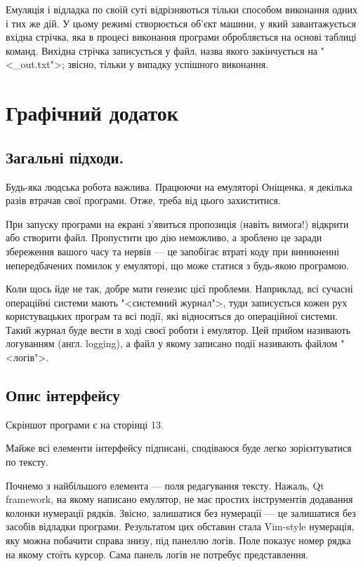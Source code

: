 \documentclass[oneside,final,14pt]{extreport}
\begin{document}
Емуляція і відладка по своїй суті відрізняються тільки способом виконання одних і тих же дій. У цьому режимі створюється об'єкт машини, у який завантажується вхідна стрічка, яка в процесі виконання програми обробляється на основі таблиці команд. Вихідна стрічка записується у файл, назва якого закінчується на "<\_out.txt">; звісно, тільки у випадку успішного виконання.

\chapter{Графічний додаток}

\section{Загальні підходи.}
Будь-яка людська робота важлива. Працюючи на емуляторі Оніщенка, я декілька разів втрачав свої програми. Отже, треба від цього захиститися.
		
При запуску програми на екрані з'явиться пропозиція (навіть вимога!) відкрити або створити файл. Пропустити цю дію неможливо, а зроблено це заради збереження вашого часу та нервів --- це запобігає втраті коду при виникненні непередбачених помилок у емуляторі, що може статися з будь-якою програмою.

Коли щось йде не так, добре мати генезис цієї проблеми. Наприклад, всі сучасні операційні системи мають "<системний журнал">, туди записується кожен рух користувацьких програм та всі події, які відносяться до операційної системи. Такий журнал буде вести в ході своєї роботи і емулятор. Цей прийом називають логуванням (англ. logging), а файл у якому записано події називають файлом "<логів">.

\section{Опис інтерфейсу}
Скріншот програми є на сторінці 13.

\medskip

Майже всі елементи інтерфейсу підписані, сподіваюся буде легко зорієнтуватися по тексту.

Почнемо з найбільшого елемента --- поля редагування тексту. Нажаль, Qt framework, на якому написано емулятор, не має простих інструментів додавання колонки нумерації рядків. Звісно, залишатися без нумерації --- це залишатися без засобів відладки програми. Результатом цих обставин стала Vim-style нумерація, яку можна побачити справа знизу, під панеллю логів. Поле показує номер рядка на якому стоїть курсор. Сама панель логів не потребує представлення.
\end{document}
